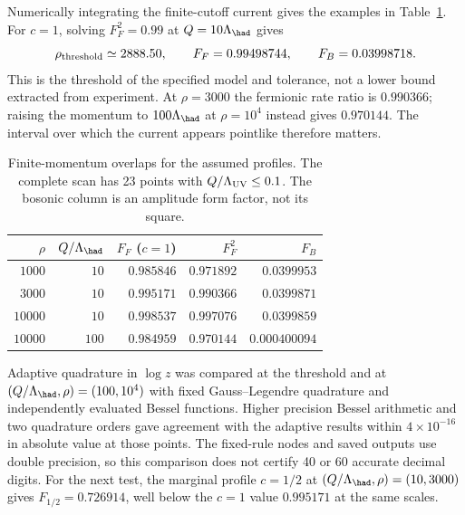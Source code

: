 Numerically integrating the finite-cutoff current gives the examples in
Table~\ref{tab:current-results}. For $c=1$, solving $F_F^2=0.99$ at
$Q=10\Lambda_{\had}$ gives
\begin{equation}
 \rho_{\rm threshold}\simeq2888.50,\qquad
 F_F=0.99498744,\qquad F_B=0.03998718.
\end{equation}
This is the threshold of the specified model and tolerance, not a lower
bound extracted from experiment. At $\rho=3000$ the fermionic rate
ratio is $0.990366$; raising the momentum to $100\Lambda_{\had}$ at
$\rho=10^4$ instead gives $0.970144$. The interval over which the
current appears pointlike therefore matters.

\begin{table}[htbp]
\centering
\begin{tabular}{rrrrr}
\toprule
$\rho$ & $Q/\Lambda_{\had}$ & $F_F$ ($c=1$) & $F_F^2$ & $F_B$\\
\midrule
$1000$ & $10$ & $0.985846$ & $0.971892$ & $0.0399953$\\
$3000$ & $10$ & $0.995171$ & $0.990366$ & $0.0399871$\\
$10000$ & $10$ & $0.998537$ & $0.997076$ & $0.0399859$\\
$10000$ & $100$ & $0.984959$ & $0.970144$ & $0.000400094$\\
\bottomrule
\end{tabular}
\caption{Finite-momentum overlaps for the assumed profiles.
The complete scan has 23 points with $Q/\Lambda_{\rm UV}\leq0.1$.
The bosonic column is an amplitude form factor, not its square.}
\label{tab:current-results}
\end{table}

Adaptive quadrature in $\log z$ was compared at the threshold and at
$(Q/\Lambda_{\had},\rho)=(100,10^4)$ with fixed Gauss--Legendre quadrature
and independently evaluated Bessel functions. Higher precision Bessel
arithmetic and two quadrature orders gave agreement with the adaptive
results within $4\times10^{-16}$ in absolute value at those points.
The fixed-rule nodes and saved outputs use double precision, so this
comparison does not certify 40 or 60 accurate decimal digits.
For the next test, the marginal profile $c=1/2$ at
$(Q/\Lambda_{\had},\rho)=(10,3000)$ gives $F_{1/2}=0.726914$,
well below the $c=1$ value $0.995171$ at the same scales.
